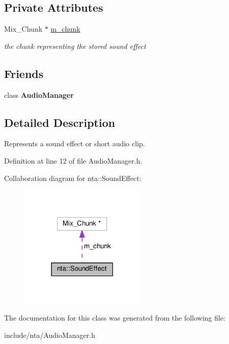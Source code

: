 \subsection*{Private Attributes}
\begin{DoxyCompactItemize}
\item 
\mbox{\label{classnta_1_1SoundEffect_a406ecb51cdbc1e757d72fae4fb35794f}} 
Mix\+\_\+\+Chunk $\ast$ \hyperlink{classnta_1_1SoundEffect_a406ecb51cdbc1e757d72fae4fb35794f}{m\+\_\+chunk}
\begin{DoxyCompactList}\small\item\em the chunk representing the stored sound effect \end{DoxyCompactList}\end{DoxyCompactItemize}
\subsection*{Friends}
\begin{DoxyCompactItemize}
\item 
\mbox{\label{classnta_1_1SoundEffect_a85edaa7e5c3ae68dabadd5373890591e}} 
class {\bfseries Audio\+Manager}
\end{DoxyCompactItemize}


\subsection{Detailed Description}
Represents a sound effect or short audio clip. 

Definition at line 12 of file Audio\+Manager.\+h.



Collaboration diagram for nta\+:\+:Sound\+Effect\+:\nopagebreak
\begin{figure}[H]
\begin{center}
\leavevmode
\includegraphics[width=170pt]{d7/d8e/classnta_1_1SoundEffect__coll__graph}
\end{center}
\end{figure}


The documentation for this class was generated from the following file\+:\begin{DoxyCompactItemize}
\item 
include/nta/Audio\+Manager.\+h\end{DoxyCompactItemize}
